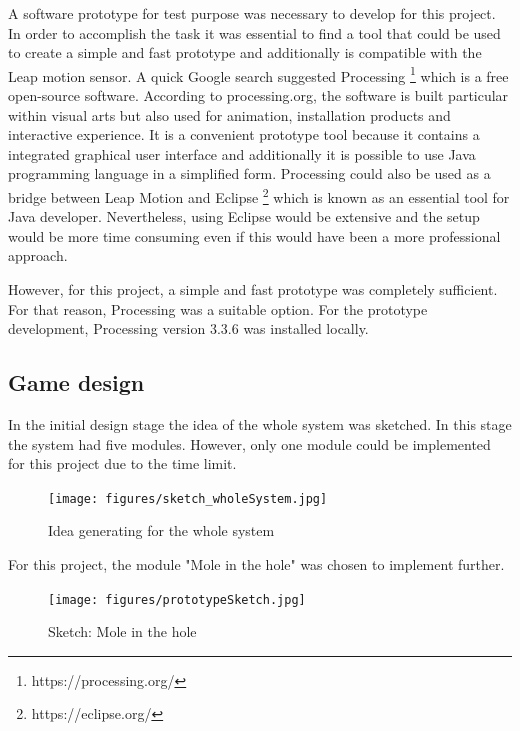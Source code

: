 A software prototype for test purpose was necessary to develop for this project. In order to accomplish the task it was essential to find a tool that could be used to create a simple and fast prototype and additionally is compatible with the Leap motion sensor. A quick Google search suggested Processing \footnote{https://processing.org/} which is a free open-source software. According to processing.org, the software is built particular within visual arts but also used for animation, installation products and interactive experience. It is a convenient prototype tool because it contains a integrated graphical user interface and additionally it is possible to use Java programming language in a simplified form.
Processing could also be used as a bridge between Leap Motion and Eclipse \footnote{https://eclipse.org/} which is known as an essential tool for Java developer.  Nevertheless, using Eclipse would be extensive and the setup would be more time consuming even if this would have been a more professional approach.

However, for this project, a simple and fast prototype was completely sufficient. For that reason, Processing was a suitable option. For the prototype development, Processing version 3.3.6 was installed locally.


\subsection{Game design}

In the initial design stage the idea of the whole system was sketched. In this stage the system had five modules. However, only one module could be implemented for this project due to the time limit.

\begin{figure}[h]  %
  \centering
  \texttt{[image: figures/sketch\_wholeSystem.jpg]}
  \caption[Idea generating.]{ Idea generating for the whole system}
  \label{fig:sketch_wholeSystem}
\end{figure}

For this project, the module "Mole in the hole" was chosen to implement further.

\begin{figure}[!h]  %
  \centering
  \texttt{[image: figures/prototypeSketch.jpg]}
  \caption[Sketch Mole in the hole.]{Sketch: Mole in the hole}
  \label{fig:prototypesketch}
\end{figure}

